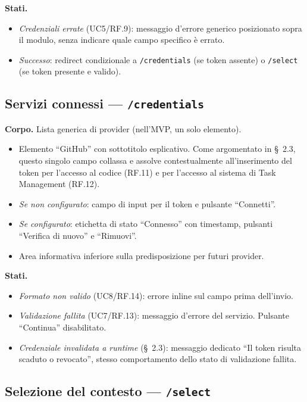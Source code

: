 \documentclass[11pt,a4paper]{article}
\begin{document}
\textbf{Stati.}
\begin{itemize}
    \item \emph{Credenziali errate} (UC5/RF.9): messaggio d'errore generico posizionato sopra il modulo, senza indicare quale campo specifico è errato.
    \item \emph{Successo}: redirect condizionale a \texttt{/credentials} (se token assente) o \texttt{/select} (se token presente e valido).
\end{itemize}

\subsection{Servizi connessi --- \texttt{/credentials}}

\textbf{Corpo.} Lista generica di provider (nell'MVP, un solo elemento).
\begin{itemize}
    \item Elemento ``GitHub'' con sottotitolo esplicativo. Come argomentato in \S~2.3, questo singolo campo collassa e assolve contestualmente all'inserimento del token per l'accesso al codice (RF.11) e per l'accesso al sistema di Task Management (RF.12).
    \item \emph{Se non configurato}: campo di input per il token e pulsante ``Connetti''.
    \item \emph{Se configurato}: etichetta di stato ``Connesso'' con timestamp, pulsanti ``Verifica di nuovo'' e ``Rimuovi''.
    \item Area informativa inferiore sulla predisposizione per futuri provider.
\end{itemize}

\textbf{Stati.}
\begin{itemize}
    \item \emph{Formato non valido} (UC8/RF.14): errore inline sul campo prima dell'invio.
    \item \emph{Validazione fallita} (UC7/RF.13): messaggio d'errore del servizio. Pulsante ``Continua'' disabilitato.
    \item \emph{Credenziale invalidata a runtime} (\S~2.3): messaggio dedicato ``Il token risulta scaduto o revocato'', stesso comportamento dello stato di validazione fallita.
\end{itemize}

\subsection{Selezione del contesto --- \texttt{/select}}
\end{document}
